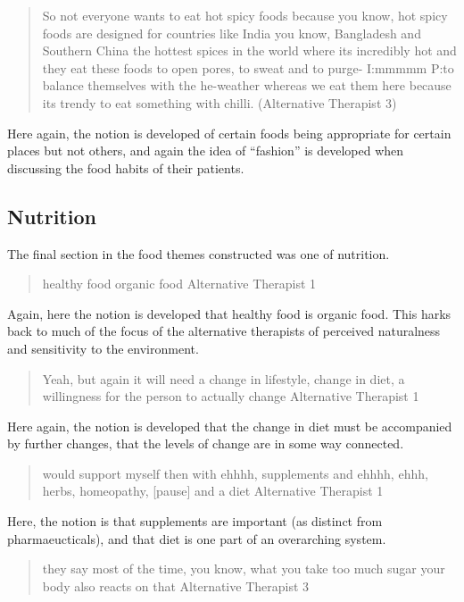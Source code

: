 \begin{quotation}
  So not everyone wants to eat hot spicy foods because you know, hot spicy foods are designed for countries like India you know, Bangladesh and Southern China the hottest spices in the world where its incredibly hot and they eat these foods to open pores, to sweat and to purge-
I:mmmmm
P:to balance themselves with the he-weather whereas we eat them here because its trendy to eat something with chilli.
(Alternative Therapist 3)
\end{quotation}

Here again, the notion is developed of certain foods being appropriate for certain places but not others, and again the idea of ``fashion'' is developed when discussing the food habits of their patients. 

\subsection{Nutrition}
\label{sec:nutrition}

The final section in the food themes constructed was one of nutrition. 

\begin{quotation}
  healthy food organic food
Alternative Therapist 1
\end{quotation}

Again, here the notion is developed that healthy food is organic food. This harks back to much of the focus of the alternative therapists of perceived naturalness and sensitivity to the environment. 

\begin{quotation}
  Yeah, but again it will need a change in lifestyle, change in diet, a willingness for the person to actually change 
Alternative Therapist 1
\end{quotation}

Here again, the notion is developed that the change in diet must be accompanied by further changes, that the levels of change are in some way connected. 

\begin{quotation}
  would support myself then with ehhhh, supplements and ehhhh, ehhh, herbs, homeopathy, [pause] and a diet
Alternative Therapist 1
\end{quotation}

Here, the notion is that supplements are important (as distinct from pharmaeucticals), and that diet is one part of an overarching system. 

\begin{quotation}
  
 they say most of the time, you know, what you take too much sugar your body also reacts on that 
Alternative Therapist 3
\end{quotation}

